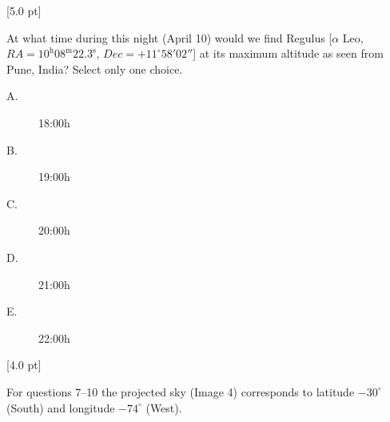 \begin{description}
  \hfill[5.0 pt]
\item[(1.6)] At what time during this night (April 10) would we find Regulus
  [$\alpha$ Leo, $RA = 10^{\mathrm{h}}08^{\mathrm{m}}22.3^{\mathrm{s}}$,
  $Dec = +11^\circ 58' 02''$] at its maximum altitude as seen from Pune,
  India? Select only one choice.
  \begin{description}
  \item[A.] 18:00h
  \item[B.] 19:00h
  \item[C.] 20:00h
  \item[D.] 21:00h
  \item[E.] 22:00h
  \end{description}
  \hfill[4.0 pt]
\end{description}

For questions 7--10 the projected sky (Image 4) corresponds to latitude
$-30^\circ$ (South) and longitude $-74^\circ$ (West).

